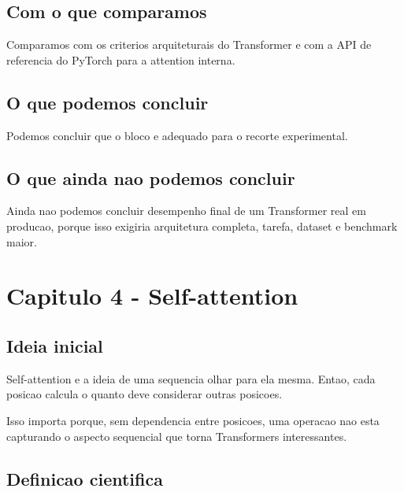 \subsection{Com o que comparamos}




Comparamos com os criterios arquiteturais do Transformer e com a API de referencia do PyTorch para a attention interna.



\subsection{O que podemos concluir}



Podemos concluir que o bloco e adequado para o recorte experimental.



\subsection{O que ainda nao podemos concluir}




Ainda nao podemos concluir desempenho final de um Transformer real em producao, porque isso exigiria arquitetura completa, tarefa, dataset e benchmark maior.



\section{Capitulo 4 - Self-attention}



\subsection{Ideia inicial}




Self-attention e a ideia de uma sequencia olhar para ela mesma. Entao, cada posicao calcula o quanto deve considerar outras posicoes.




Isso importa porque, sem dependencia entre posicoes, uma operacao nao esta capturando o aspecto sequencial que torna Transformers interessantes.



\subsection{Definicao cientifica}





